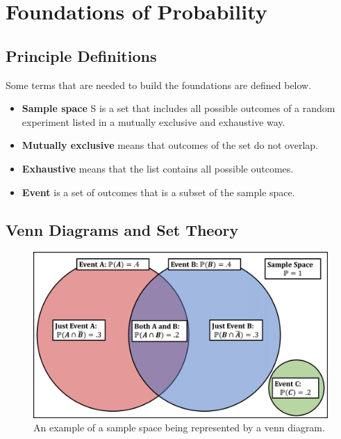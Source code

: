
\section{Foundations of Probability}

\subsection{Principle Definitions}
Some terms that are needed to build the foundations are defined below.
\begin{itemize}
    \item \textbf{Sample space} S is a set that includes all possible outcomes of a random experiment listed in a mutually exclusive and exhaustive way.
    \item \textbf{Mutually exclusive} means that outcomes of the set do not overlap.
    \item \textbf{Exhaustive} means that the list contains all possible outcomes.
    \item \textbf{Event} is a set of outcomes that is a subset of the sample space.
\end{itemize}

\subsection{Venn Diagrams and Set Theory}

\begin{figure}[!hbtp]
    \centering
    \includegraphics[scale=.3]{Images/venndiagram.PNG}
    \caption{An example of a sample space being represented by a venn diagram.}
    \label{fig:venndiagram}
\end{figure}